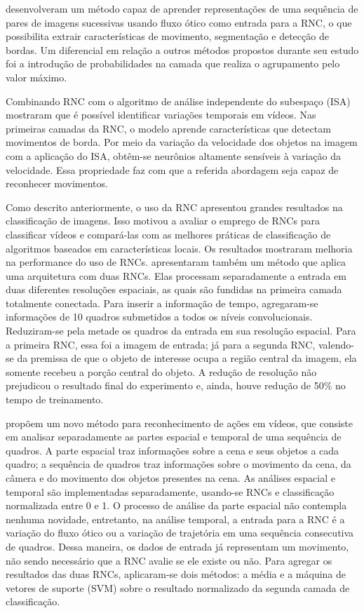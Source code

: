 \documentclass[
	12pt,				%
    oneside,			%
	a4paper,			%
	english,			%
	french,				%
	spanish,			%
	brazil,				%
	]{abntex2}
\begin{document}
 desenvolveram um método capaz de aprender representações de uma sequência de pares de imagens sucessivas usando fluxo ótico como entrada para a RNC, o que possibilita extrair características de movimento, segmentação e detecção de bordas. Um diferencial em relação a outros métodos propostos durante seu estudo foi a introdução de probabilidades na camada que realiza o agrupamento pelo valor máximo. 

Combinando RNC com o algoritmo de análise independente do subespaço (ISA)  mostraram que é possível identificar variações temporais em vídeos. Nas primeiras camadas da RNC, o modelo aprende características que detectam movimentos de borda. Por meio da variação da velocidade dos objetos na imagem com a aplicação do ISA, obtêm-se neurônios altamente sensíveis à variação da velocidade. Essa propriedade faz com que a referida abordagem seja capaz de reconhecer movimentos.

Como descrito anteriormente, o uso da  RNC apresentou grandes resultados na classificação de imagens. Isso motivou  a avaliar o emprego de RNCs para classificar vídeos e compará-las com as melhores práticas de classificação de algoritmos baseados em características locais. Os resultados mostraram melhoria na performance do uso de RNCs.  apresentaram também um método que aplica uma arquitetura com duas RNCs. Elas processam separadamente a entrada em duas diferentes resoluções espaciais, as quais são fundidas na primeira camada totalmente conectada. Para inserir a informação de tempo, agregaram-se informações de 10 quadros submetidos a todos os níveis convolucionais. Reduziram-se pela metade os quadros da entrada em sua resolução espacial. Para a primeira RNC, essa foi a imagem de entrada; já para a segunda RNC, valendo-se da premissa de que o objeto de interesse ocupa a região central da imagem, ela somente recebeu a porção central do objeto. A redução de resolução não prejudicou o resultado final do experimento e, ainda, houve redução de 50\% no tempo de treinamento.

 propõem um novo método para reconhecimento de ações em vídeos, que consiste em analisar separadamente as partes espacial e temporal de uma sequência de quadros. A parte espacial traz informações sobre a cena e seus objetos a cada quadro; a sequência de quadros traz informações sobre o movimento da cena, da câmera e do movimento dos objetos presentes na cena. As análises espacial e temporal são implementadas separadamente, usando-se RNCs e classificação normalizada entre 0 e 1. O processo de análise da parte espacial não contempla nenhuma novidade, entretanto, na análise temporal, a entrada para a RNC é a variação do fluxo ótico ou a variação de trajetória em uma sequência consecutiva de quadros. Dessa maneira, os dados de entrada já representam um movimento, não sendo necessário que a RNC avalie se ele existe ou não. Para agregar os resultados das duas RNCs, aplicaram-se dois métodos: a média e a máquina de vetores de suporte (SVM) sobre o resultado normalizado da segunda camada de classificação.
\end{document}
